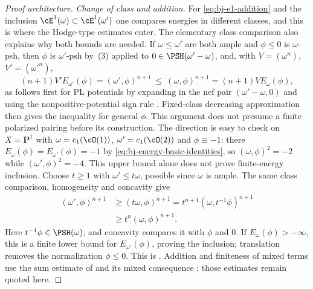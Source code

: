 \begin{proof}[Proof architecture]
\emph{Change of class and addition.}  For \eqref{eq:bj-e1-addition} and the
inclusion $\cE^1(\omega)\subset\cE^1(\omega')$ one compares energies in
different classes, and this is where the Hodge-type estimates enter.  The elementary class comparison also explains why both bounds are needed.  If $\omega\le\omega'$ are both
ample and $\phi\le0$ is $\omega$-psh, then $\phi$ is
$\omega'$-psh by \,(3) applied to
$0\in\PSH(\omega'-\omega)$, and, with
$V=(\omega^n)$, $V'=(\omega'^n)$,
\[
 (n+1)V'E_{\omega'}(\phi)=(\omega',\phi)^{n+1}
 \ \le\ (\omega,\phi)^{n+1}=(n+1)VE_\omega(\phi),
\]
as follows first for PL potentials by expanding in the nef pair
$(\omega'-\omega,0)$ and using the nonpositive-potential sign rule
\cite[Corollary~3.16]{BJ22}.  Fixed-class decreasing approximation then
gives the inequality for general $\phi$.  This argument does not presume
a finite polarized pairing before its construction.  The direction is easy to check on
$X=\mathbf P^1$ with $\omega=c_1(\cO(1))$, $\omega'=c_1(\cO(2))$ and
$\phi\equiv-1$: there $E_\omega(\phi)=E_{\omega'}(\phi)=-1$ by
\eqref{eq:bj-energy-basic-identities}, so $(\omega,\phi)^2=-2$ while
$(\omega',\phi)^2=-4$.  This upper bound alone does not prove finite-energy inclusion.  Choose
$t\ge1$ with $\omega'\le t\omega$, possible since $\omega$ is ample.
The same class comparison, homogeneity and concavity give
\[
 \begin{aligned}
 (\omega',\phi)^{n+1}
 &\ge(t\omega,\phi)^{n+1}
   =t^{n+1}(\omega,t^{-1}\phi)^{n+1}\\
 &\ge t^n(\omega,\phi)^{n+1}.
 \end{aligned}
\]
Here $t^{-1}\phi\in\PSH(\omega)$, and concavity compares it with
$\phi$ and $0$.  If $E_\omega(\phi)>-\infty$, this is a finite lower
bound for $E_{\omega'}(\phi)$, proving the inclusion; translation removes
the normalization $\phi\le0$.  This is \cite[Lemma~7.9]{BJ22}.
Addition and finiteness of mixed terms use the sum estimate of
\cite[Lemma~7.10]{BJ22} and its mixed consequence
\cite[Corollary~7.11]{BJ22}; those estimates remain quoted here.
\end{proof}

